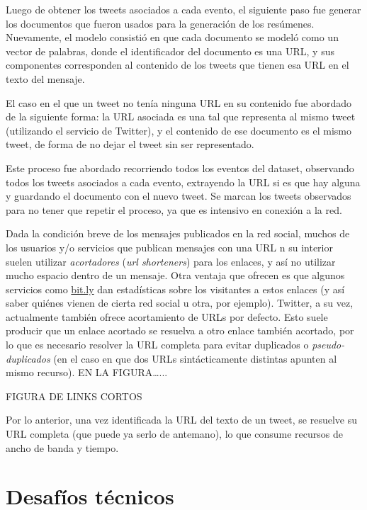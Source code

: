 \documentclass[upright, contnum]{umemoria}
\begin{document}
    Luego de obtener los tweets asociados a cada evento, el siguiente
    paso fue generar los documentos que fueron usados para la
    generación de los resúmenes. Nuevamente, el modelo consistió en que cada
    documento se modeló como un vector de palabras, donde el
    identificador del documento es una URL, y sus componentes
    corresponden al contenido de los tweets que tienen esa URL en el
    texto del mensaje.

    El caso en el que un tweet no tenía ninguna URL en su contenido
    fue abordado de la siguiente forma: la URL asociada es una tal que
    representa al mismo tweet (utilizando el servicio de Twitter), y
    el contenido de ese documento es el mismo tweet, de forma de no
    dejar el tweet sin ser representado.

    Este proceso fue abordado recorriendo todos los eventos del
    dataset, observando todos los tweets asociados a cada evento,
    extrayendo la URL si es que hay alguna y guardando el documento
    con el nuevo tweet. Se marcan los tweets observados para no tener
    que repetir el proceso, ya que es intensivo en conexión a la red.

    Dada la condición breve de los mensajes publicados en la red
    social, muchos de los usuarios y/o servicios que publican mensajes
    con una URL n su interior suelen utilizar \emph{acortadores} (\emph{url shorteners})
    para los enlaces, y así no utilizar mucho espacio dentro de un
    mensaje. Otra ventaja que ofrecen es que algunos servicios como
    \hyperref[sec-4.3.3]{bit.ly} dan estadísticas sobre los visitantes a estos enlaces (y
    así saber quiénes vienen de cierta red social u otra, por
    ejemplo). Twitter, a su vez, actualmente también ofrece
    acortamiento de URLs por defecto. Esto suele producir que un enlace
    acortado se resuelva a otro enlace también acortado, por lo que es
    necesario resolver la URL completa para evitar duplicados o
    \emph{pseudo-duplicados} (en el caso en que dos URLs sintácticamente
    distintas apunten al mismo recurso). EN LA FIGURA\ldots{}...

    FIGURA DE LINKS CORTOS

    Por lo anterior, una vez identificada la URL del texto de un
    tweet, se resuelve su URL completa (que puede ya serlo de
    antemano), lo que consume recursos de ancho de banda y
    tiempo. 

\section{Desafíos técnicos}
\label{sec-4.4}
\end{document}
